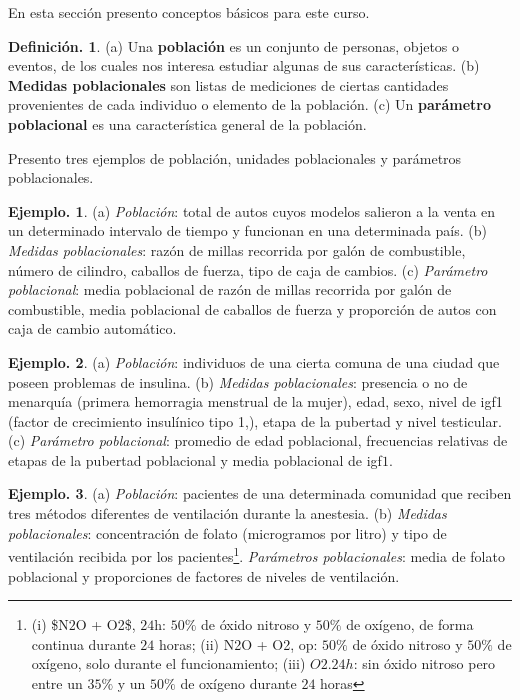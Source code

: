 \documentclass[]{book}
\theoremstyle{definition}
\newtheorem{definition}{Definición.}[chapter]
\theoremstyle{definition}
\newtheorem{example}{Ejemplo.}[chapter]
\theoremstyle{definition}
\theoremstyle{remark}
\begin{document}
En esta sección presento conceptos básicos para
este
curso.

\begin{definition}
\protect\hypertarget{def:unnamed-chunk-37}{}{\label{def:unnamed-chunk-37} }(a) Una \textbf{población} es un conjunto de personas,
objetos
o eventos, de los
cuales nos interesa estudiar algunas de sus
características. (b) \textbf{Medidas poblacionales} son
listas
de mediciones de ciertas cantidades provenientes
de cada
individuo o elemento de la población. (c) Un
\textbf{parámetro
poblacional} es una característica general de la
población.
\end{definition}

Presento tres ejemplos de población, unidades
poblacionales y parámetros poblacionales.

\begin{example}
\protect\hypertarget{exm:unnamed-chunk-38}{}{\label{exm:unnamed-chunk-38} }(a) \emph{Población}: total de autos cuyos modelos
salieron a
la venta en un determinado intervalo de tiempo y
funcionan en una determinada país. (b) \emph{Medidas
poblacionales}: razón de millas recorrida por
galón de
combustible, número de cilindro, caballos de
fuerza, tipo
de caja de cambios. (c) \emph{Parámetro poblacional}:
media
poblacional de razón de millas recorrida por galón
de
combustible, media poblacional de caballos de
fuerza y
proporción de autos con caja de cambio automático.
\end{example}

\begin{example}
\protect\hypertarget{exm:unnamed-chunk-39}{}{\label{exm:unnamed-chunk-39} }(a) \emph{Población}: individuos de una cierta comuna
de una
ciudad que poseen problemas de insulina.
(b) \emph{Medidas poblacionales}: presencia o no de
menarquía
(primera hemorragia menstrual de la mujer), edad,
sexo,
nivel de igf1 (factor de crecimiento insulínico
tipo 1,),
etapa de la pubertad y nivel testicular. (c)
\emph{Parámetro
poblacional}: promedio de edad poblacional,
frecuencias
relativas de etapas de la pubertad poblacional y
media
poblacional de igf\(1\).
\end{example}

\begin{example}
\protect\hypertarget{exm:unnamed-chunk-40}{}{\label{exm:unnamed-chunk-40} }(a) \emph{Población}: pacientes de una determinada
comunidad
que reciben tres métodos diferentes de
ventilación durante la anestesia. (b) \emph{Medidas
poblacionales}: concentración de folato
(microgramos por litro) y tipo de ventilación
recibida
por los pacientes\footnote{(i) \$\mbox{N$2$O} +
  \mbox{O}2\$, \(24\)h: \(50\%\) de óxido nitroso y
  \(50\%\) de
  oxígeno, de forma continua durante \(24\)
  horas; (ii) N2O + O2, op: \(50\%\) de óxido nitroso
  y
  \(50\%\) de oxígeno, solo durante el
  funcionamiento; (iii) \(O2.24h\): sin óxido nitroso
  pero
  entre un \(35\%\) y un \(50\%\) de oxígeno
  durante \(24\) horas}. \emph{Parámetros poblacionales}:
media
de folato poblacional y proporciones de
factores de niveles de ventilación.
\end{example}
\end{document}
